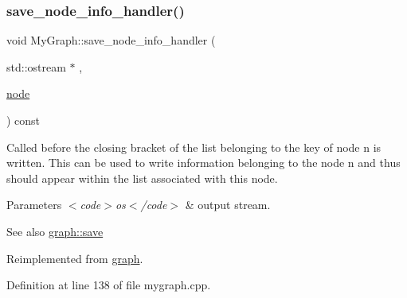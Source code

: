 \subsubsection{\texorpdfstring{save\+\_\+node\+\_\+info\+\_\+handler()}{save\_node\_info\_handler()}}
{\footnotesize\ttfamily void My\+Graph\+::save\+\_\+node\+\_\+info\+\_\+handler (\begin{DoxyParamCaption}\item[{std\+::ostream $\ast$}]{,  }\item[{\mbox{\hyperlink{classnode}{node}}}]{ }\end{DoxyParamCaption}) const\hspace{0.3cm}{\ttfamily [virtual]}}

Called before the closing bracket of the list belonging to the key of node {\ttfamily n} is written. This can be used to write information belonging to the node {\ttfamily n} and thus should appear within the list associated with this node.


\begin{DoxyParams}{Parameters}
{\em $<$code$>$os$<$/code$>$} & output stream. \\
\hline
\end{DoxyParams}
\begin{DoxySeeAlso}{See also}
\mbox{\hyperlink{classgraph_a7bd0712a528249d1585085a64ac3e661}{graph\+::save}} 
\end{DoxySeeAlso}


Reimplemented from \mbox{\hyperlink{classgraph_a994f87e1b7f1f723cf03e54e2eb7a99d}{graph}}.



Definition at line 138 of file mygraph.\+cpp.


